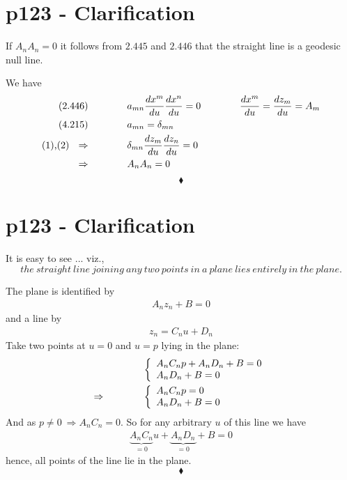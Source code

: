 \section{p123 - Clarification}
\begin{tcolorbox}
If $A_{n}A_{n} =0$ it follows from $\mathbf{2.445}$ and $\mathbf{2.446}$ that the straight line is a geodesic null line.
\end{tcolorbox}
We have 
\begin{align}
\text{(2.446)}\quad\quad\quad\quad & a_{mn}\dv{x^m}{u}\dv{x^n}{u}=0 \quad\quad\quad\quad \dv{x^m}{u}= \dv{z_m}{u} = A_m\\
\text{(4.215)}\quad\quad\quad\quad & a_{mn}=\delta_{mn}\\
\text{(1),(2) \ }\Rightarrow \quad\quad\quad\quad &\delta_{mn}\dv{z_m}{u}\dv{z_n}{u}=0\\
\Rightarrow \quad\quad\quad\quad &A_nA_n=0
\end{align}
$$\blacklozenge$$
\newpage


\section{p123 - Clarification}
\begin{tcolorbox}
It is easy to see ... viz., $$\mathit{the \ straight \ line \ joining \ any \ two \ points \ in \ a \ plane \ lies \ entirely \ in \ the \ plane.}$$ 
\end{tcolorbox}
The plane is identified by 
\begin{align}
A_n z_n+B=0
\end{align}
and a line by
\begin{align}
z_n = C_nu+D_n
\end{align}
Take two points at $u=0$ and $u=p$ lying in the plane:
\begin{align}
& \left\{ \begin{array}{l}
A_nC_np+A_nD_n+B=0\\
A_nD_n+B=0
\end{array} \right.\\
\Rightarrow\quad\quad\quad\quad & \left\{ \begin{array}{l}
A_nC_np=0\\
A_nD_n+B=0
\end{array} \right.
\end{align}
And as $p\neq 0 \ \Rightarrow A_nC_n = 0$. So for any arbitrary $u$ of this line we have
\begin{align}
\underbrace{A_nC_n}_{=0}u+\underbrace{A_nD_n}_{=0}+B=0
\end{align}
hence, all points of the line lie in the plane.
$$\blacklozenge$$
\newpage


